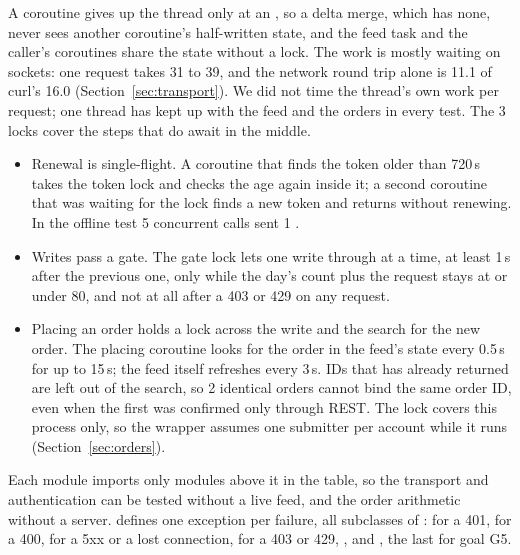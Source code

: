 

 A coroutine gives up the thread only at an , so a delta merge, which has none, never sees another coroutine's half-written state, and the feed task and the caller's coroutines share the state without a lock. The work is mostly waiting on sockets: one request takes 31 to 39\ms, and the network round trip alone is 11.1\ms{} of curl's 16.0\ms{} (Section~\ref{sec:transport}). We did not time the thread's own work per request; one thread has kept up with the feed and the orders in every test. The 3 locks cover the steps that do await in the middle.
\begin{itemize}
\item Renewal is single-flight. A coroutine that finds the token older than 720\,s takes the token lock and checks the age again inside it; a second coroutine that was waiting for the lock finds a new token and returns without renewing. In the offline test 5 concurrent  calls sent 1 .
\item Writes pass a gate. The gate lock lets one write through at a time, at least 1\,s after the previous one, only while the day's count plus the request stays at or under 80, and not at all after a 403 or 429 on any request.
\item Placing an order holds a lock across the write and the search for the new order. The placing coroutine looks for the order in the feed's state every 0.5\,s for up to 15\,s; the feed itself refreshes every 3\,s. IDs that  has already returned are left out of the search, so 2 identical orders cannot bind the same order ID, even when the first was confirmed only through REST. The lock covers this process only, so the wrapper assumes one submitter per account while it runs (Section~\ref{sec:orders}).
\end{itemize}



 Each module imports only modules above it in the table, so the transport and authentication can be tested without a live feed, and the order arithmetic without a server.  defines one exception per failure, all subclasses of :  for a 401,  for a 400,  for a 5xx or a lost connection,  for a 403 or 429, ,  and , the last for goal G5.

